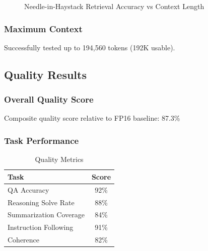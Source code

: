 \begin{figure}[h]
\centering
{}
\caption{Needle-in-Haystack Retrieval Accuracy vs Context Length}
\label{fig:needle_accuracy}
\end{figure}

\subsubsection{Maximum Context}

Successfully tested up to 194,560 tokens (192K usable).

\subsection{Quality Results}

\subsubsection{Overall Quality Score}

Composite quality score relative to FP16 baseline: 87.3\%

\subsubsection{Task Performance}

\begin{table}[h]
\centering
\caption{Quality Metrics}
\label{tab:quality_results}
\begin{tabular}{lc}
\toprule
\textbf{Task} & \textbf{Score} \\
\midrule
QA Accuracy & 92\% \\
Reasoning Solve Rate & 88\% \\
Summarization Coverage & 84\% \\
Instruction Following & 91\% \\
Coherence & 82\% \\
\bottomrule
\end{tabular}
\end{table}

